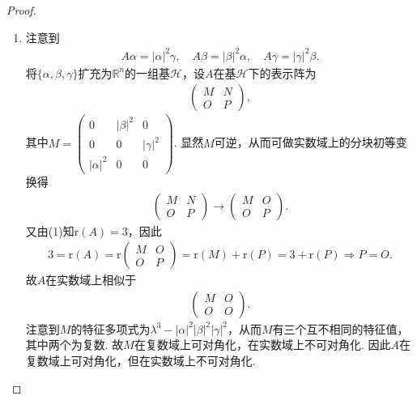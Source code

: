 \documentclass[../../main.tex]{subfiles}%
\begin{document}
\begin{proof}
\begin{enumerate}[(1)]
\item 注意到
\begin{align*}
A\alpha=|\alpha|^2\gamma,\quad A\beta=|\beta|^2\alpha,\quad A\gamma=|\gamma|^2\beta.
\end{align*}
将$\{\alpha,\beta,\gamma\}$扩充为$\mathbb{R}^n$的一组基$\mathscr{H}$，设$A$在基$\mathscr{H}$下的表示阵为
\begin{align*}
\begin{pmatrix}
M&N\\
O& P
\end{pmatrix},
\end{align*}
其中$M=\begin{pmatrix}
0&|\beta|^2&0\\
0&0&|\gamma|^2\\
|\alpha|^2&0&0
\end{pmatrix}$.
显然$M$可逆，从而可做实数域上的分块初等变换得
\begin{align*}
\begin{pmatrix}
M&N\\
O& P
\end{pmatrix}\rightarrow \begin{pmatrix}
M&O\\
O& P
\end{pmatrix}.
\end{align*}
又由(1)知$\text{r}(A)=3$，因此
\begin{align*}
3=\text{r}(A)=\text{r}\begin{pmatrix}
M&O\\
O& P
\end{pmatrix}=\text{r}(M)+\text{r}(P)=3+\text{r}(P)\Longrightarrow P=O.
\end{align*}
故$A$在实数域上相似于
\begin{align*}
\begin{pmatrix}
M&O\\
O&O
\end{pmatrix}.
\end{align*}
注意到$M$的特征多项式为$\lambda^3-|\alpha|^2|\beta|^2|\gamma|^2$，从而$M$有三个互不相同的特征值，其中两个为复数. 故$M$在复数域上可对角化，在实数域上不可对角化. 因此$A$在复数域上可对角化，但在实数域上不可对角化.
\end{enumerate}
\end{proof}
\end{document}
